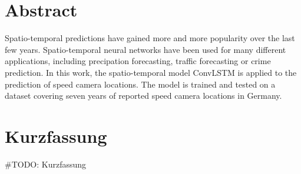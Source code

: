 \section*{Abstract}
Spatio-temporal predictions have gained more and more popularity over the last few years.
Spatio-temporal neural networks have been used for many different applications,
including precipation forecasting, traffic forecasting or crime prediction.
In this work, the spatio-temporal model ConvLSTM is applied to the prediction of speed camera locations.
The model is trained and tested on a dataset covering seven years of reported speed camera locations in Germany.



\section*{Kurzfassung}
\#TODO: Kurzfassung
